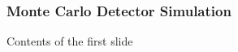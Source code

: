 \begin{frame}
\frametitle{Monte Carlo Detector Simulation}

 Contents of the first slide

\end{frame}


